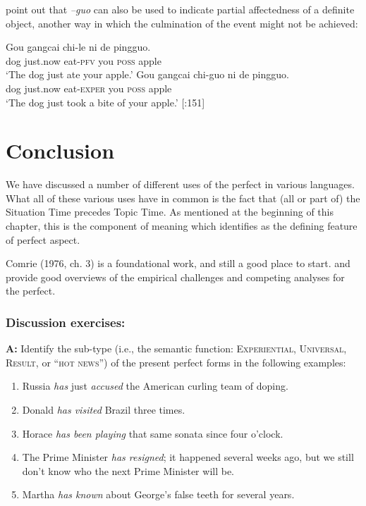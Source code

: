 \citet{HuangDavis1989} point out that \textit{–guo} can also be used to indicate partial affectedness of a definite object, another way in which the culmination of the event might not be achieved:


\ea
\ea \gll  Gou  gangcai  chi-le  ni  de  pingguo.\\
dog  just.now  eat-\textsc{pfv}  you  \textsc{poss}  apple\\
\glt ‘The dog just ate your apple.’
\ex \gll  Gou  gangcai  chi-guo  ni  de  pingguo.\\
dog  just.now  eat-\textsc{exper}  you  \textsc{poss}  apple\\
\glt ‘The dog just took a bite of your apple.’  [\citealt{HuangDavis1989}:151]
\z \z

\section{Conclusion}\label{sec:} %

We have discussed a number of different uses of the perfect in various languages. What all of these various uses have in common is the fact that (all or part of) the Situation Time precedes Topic Time. As mentioned at the beginning of this chapter, this is the component of meaning which \citet{Klein1992} identifies as the defining feature of perfect aspect.



\furtherreading



Comrie (1976, ch. 3) is a foundational work, and still a good place to start. \citet{Portner2011} and \citet{Ritz2012} provide good overviews of the empirical challenges and competing analyses for the perfect.


\subsubsection{Discussion exercises:}\label{sec:}

\textbf{A:} Identify the sub-type (i.e., the semantic function: \textsc{Experiential, Universal, Result}, or “\textsc{hot news}”) of the present perfect forms in the following examples:

\begin{enumerate}
\item Russia \textit{has} just \textit{accused} the American curling team of doping.
\item Donald \textit{has visited} Brazil three times.
\item Horace \textit{has been playing} that same sonata since four o’clock.
\item The Prime Minister \textit{has resigned}; it happened several weeks ago, but we still don’t know who the next Prime Minister will be.
\item Martha \textit{has known} about George’s false teeth for several years.
\end{enumerate}
